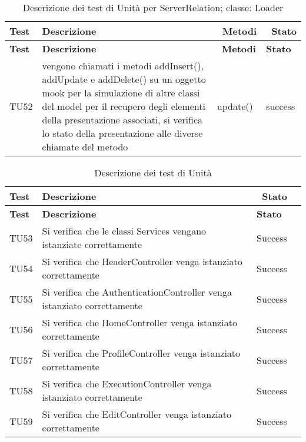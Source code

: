   \begin{longtable} [c]{| p{2cm} | p{6cm} |p{3cm} | p{2cm} |}
		 	 						\caption{Descrizione dei test di Unità per ServerRelation; classe: Loader \label{tab:verTestUnit}}\\
	  		 \hline
	  		 \textbf{Test} & \textbf{Descrizione} & \ \textbf{Metodi} & \ \textbf{Stato} \\
	  		 \hline
	  		 \endfirsthead
	  		 \hline
	  		 \textbf{Test} & \textbf{Descrizione} & \ \textbf{Metodi} & \textbf{Stato} \\
	  		 \hline
		 	 						\endhead
	  		 \hline
	  		 \endfoot
	  		 \hline
	  		 \endlastfoot
 		 TU52 & vengono chiamati i metodi addInsert(), addUpdate e addDelete() su un oggetto mook per la simulazione di altre classi del model per il recupero degli elementi della presentazione associati, si verifica lo stato della presentazione alle diverse chiamate del metodo  & update() & success \\
 		 \end{longtable}
 		 
	 \begin{longtable} [c]{| p{2cm} | p{6cm} |p{3cm} | p{2cm} |}
		 			\caption{Descrizione dei test di Unità \label{tab:verTestUnit}}\\
	 		 \hline
	 		 \textbf{Test} & \textbf{Descrizione} & \ \textbf{Stato} \\
	 		 \hline
	 		 \endfirsthead
	 		 \hline
	 		 \textbf{Test} & \textbf{Descrizione} & \textbf{Stato} \\
	 		 \hline
		 			\endhead
	 		 \hline
	 		 \endfoot
	 		 \hline
	 		 \endlastfoot
          TU53 & Si verifica che le classi Services vengano istanziate correttamente & Success \\
          \hline
          TU54 & Si verifica che HeaderController venga istanziato correttamente & Success \\
          \hline 
          TU55 & Si verifica che AuthenticationController venga istanziato correttamente & Success\\
          \hline
          TU56 & Si verifica che HomeController venga istanziato correttamente & Success \\
          \hline
          TU57 & Si verifica che ProfileController venga istanziato correttamente & Success \\
          \hline
          TU58 & Si verifica che ExecutionController venga istanziato correttamente & Success \\
          \hline
          TU59 & Si verifica che EditController venga istanziato correttamente & Success \\
		 		\end{longtable}
 				 
